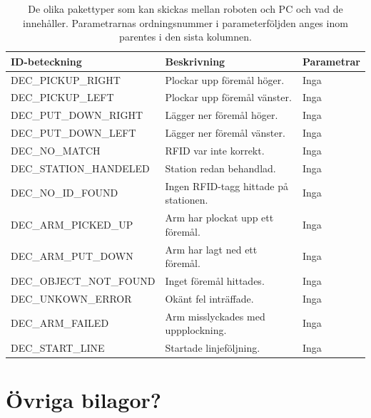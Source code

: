 \begin{table}[H]
\label{decision}
\begin{tabularx}{\textwidth}{|l|l|X|}
\hline
\textbf{ID-beteckning} & \textbf{Beskrivning} & \textbf{Parametrar} \\ \hline
DEC\_PICKUP\_RIGHT & Plockar upp föremål höger. & Inga \\ \hline
DEC\_PICKUP\_LEFT & Plockar upp föremål vänster. & Inga \\ \hline
DEC\_PUT\_DOWN\_RIGHT & Lägger ner föremål höger. & Inga \\ \hline
DEC\_PUT\_DOWN\_LEFT & Lägger ner föremål vänster. & Inga \\ \hline
DEC\_NO\_MATCH & RFID var inte korrekt. & Inga \\ \hline
DEC\_STATION\_HANDELED & Station redan behandlad. & Inga \\ \hline
DEC\_NO\_ID\_FOUND & Ingen RFID-tagg hittade på stationen. & Inga \\ \hline
DEC\_ARM\_PICKED\_UP & Arm har plockat upp ett föremål. & Inga \\ \hline
DEC\_ARM\_PUT\_DOWN & Arm har lagt ned ett föremål. & Inga \\ \hline
DEC\_OBJECT\_NOT\_FOUND & Inget föremål hittades. & Inga \\ \hline
DEC\_UNKOWN\_ERROR & Okänt fel inträffade. & Inga \\ \hline
DEC\_ARM\_FAILED & Arm misslyckades med uppplockning. & Inga \\ \hline
DEC\_START\_LINE & Startade linjeföljning. & Inga \\ \hline
\end{tabularx}
\caption{De olika pakettyper som kan skickas mellan roboten och PC och vad de innehåller. Parametrarnas ordningsnummer i parameterföljden anges inom parentes i den sista kolumnen.}
\end{table}

\section{Övriga bilagor?}
